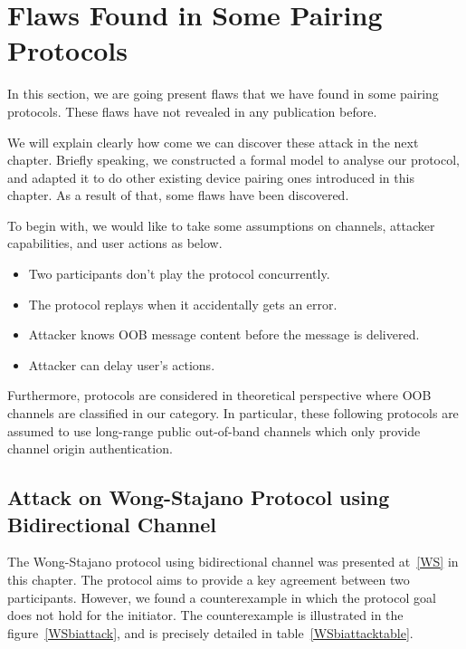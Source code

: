 \section{Flaws Found in Some Pairing Protocols}

In this section, we are going present flaws that we have found in some pairing protocols. These flaws have not revealed in any publication before. 

We will explain clearly how come we can discover these attack in the next chapter. Briefly speaking, we constructed a formal model to analyse our protocol, and adapted it to do other existing device pairing ones introduced in this chapter. As a result of that, some flaws have been discovered. 

To begin with, we would like to take some assumptions on channels, attacker capabilities, and user actions as below. 
\begin{itemize}
\item Two participants don't play the protocol concurrently.
\item The protocol replays when it accidentally gets an error. 
\item Attacker knows OOB message content before the message is delivered.
\item Attacker can delay user's actions. 
\end{itemize}

Furthermore, protocols are considered in theoretical perspective where OOB channels are classified in our category. In particular, these following protocols are assumed to use long-range public out-of-band channels which only provide channel origin authentication.  

\subsection{Attack on Wong-Stajano Protocol using Bidirectional Channel}

The Wong-Stajano protocol using bidirectional channel was presented at~\ref{WS} in this chapter. The protocol aims to provide a key agreement between two participants. However, we found a counterexample in which the protocol goal does not hold for the initiator. The counterexample is illustrated in the figure~\ref{WSbiattack}, and is precisely detailed in table~\ref{WSbiattacktable}. 

